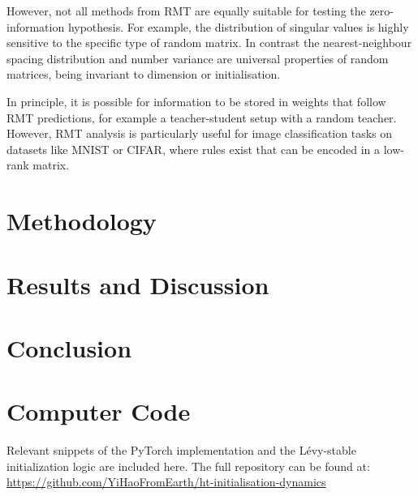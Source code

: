 \documentclass[11pt,oneside]{report}
\begin{document}
However, not all methods from RMT are equally suitable for testing the zero-information hypothesis. For example, the distribution of singular values is highly sensitive to the specific type of random matrix. In contrast the nearest-neighbour spacing distribution and number variance are universal properties of random matrices, being invariant to dimension or initialisation. 

In principle, it is possible for information to be stored in weights that follow RMT predictions, for example a teacher-student setup with a random teacher. However, RMT analysis is particularly useful for image classification tasks on datasets like MNIST or CIFAR, where rules exist that can be encoded in a low-rank matrix.

\chapter{Methodology}
\label{chap:method}

\chapter{Results and Discussion}
\label{chap:results}

\chapter{Conclusion}
\label{chap:conclusion}

\newpage
{}
\nocite{*}
\printbibliography[heading=bibintoc, title={References}]

\appendix
\chapter{Computer Code}
Relevant snippets of the PyTorch implementation and the Lévy-stable initialization logic are included here. The full repository can be found at: \url{https://github.com/YiHaoFromEarth/ht-initialisation-dynamics}
\end{document}
